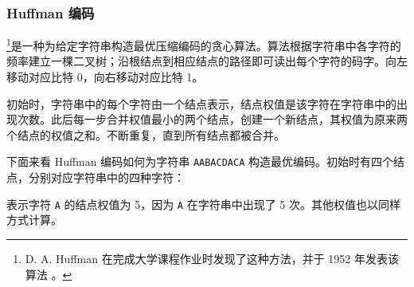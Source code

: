 
\subsubsection{Huffman 编码}

\footnote{D. A. Huffman 在完成大学课程作业时发现了这种方法，并于 1952 年发表该算法 \cite{huf52}。}是一种为给定字符串构造最优压缩编码的贪心算法。算法根据字符串中各字符的频率建立一棵二叉树；沿根结点到相应结点的路径即可读出每个字符的码字。向左移动对应比特 0，向右移动对应比特 1。

初始时，字符串中的每个字符由一个结点表示，结点权值是该字符在字符串中的出现次数。此后每一步合并权值最小的两个结点，创建一个新结点，其权值为原来两个结点的权值之和。不断重复，直到所有结点都被合并。

下面来看 Huffman 编码如何为字符串 \texttt{AABACDACA} 构造最优编码。初始时有四个结点，分别对应字符串中的四种字符：

\begin{center}
\end{center}
表示字符 \texttt{A} 的结点权值为 5，因为 \texttt{A} 在字符串中出现了 5 次。其他权值也以同样方式计算。

